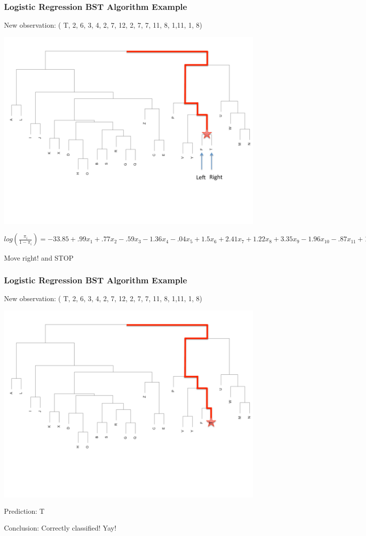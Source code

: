 \documentclass{beamer}
\begin{document}
\begin{frame}
\frametitle{\small{Logistic Regression BST Algorithm Example}}
\small{New observation: ( T, 2,     6,     3,    4,     2,     7,    12,      2,      7,      7,      11,       8,     1,11,     1,      8)}
\begin{center} 
\includegraphics[width=.7 \textwidth]{fifthStep}

\tiny{$log(\frac{\pi_i}{1-\pi_i})= -33.85+.99x_1+.77x_2-.59x_3-1.36x_4-.04x_5+1.5x_6+2.41x_7+1.22x_8+3.35x_{9}-1.96x_{10}-.87x_{11}+1.61x_{12}+.33x_{13}+.66x_{14}-1.25x_{15}-1.32x_{16} \rightarrow \hat{\pi}=0.999$}
\end{center}
Move right! and STOP

\end{frame}

\begin{frame}
\frametitle{\small{Logistic Regression BST Algorithm Example}}
\small{New observation: ( T, 2,     6,     3,    4,     2,     7,    12,      2,      7,      7,      11,       8,     1,11,     1,      8)}
\begin{center} 
\includegraphics[width=.7 \textwidth]{sixthStep}

\end{center}

Prediction: T 

Conclusion: Correctly classified! Yay!

\end{frame}
\end{document}
